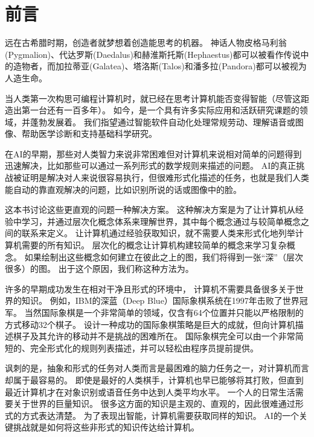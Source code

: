 \chapter{前言}
\label{chap:introduction}
远在古希腊时期，创造者就梦想着创造能思考的机器。
神话人物皮格马利翁(Pygmalion)、代达罗斯(Daedalus)和赫淮斯托斯(Hephaestus)都可以被看作传说中的造物者，而加拉蒂亚(Galatea)、塔洛斯(Talos)和潘多拉(Pandora)都可以被视为人造生命\citep{ovid2004metamorphoses,sparkes1996red,1997works}。

当人类第一次构思可编程计算机时，就已经在思考计算机能否变得智能（尽管这距造出第一台还有一百多年）\citep{Lovelace1842}。
如今，是一个具有许多实际应用和活跃研究课题的领域，并蓬勃发展着。
我们指望通过智能软件自动化处理常规劳动、理解语音或图像、帮助医学诊断和支持基础科学研究。

在\gls{AI}的早期，那些对人类智力来说非常困难但对计算机来说相对简单的问题得到迅速解决，比如那些可以通过一系列形式的数学规则来描述的问题。
\gls{AI}的真正挑战被证明是解决对人来说很容易执行，但很难形式化描述的任务，也就是我们人类能自动的靠直观解决的问题，比如识别所说的话或图像中的脸。

这本书讨论这些更直观的问题一种解决方案。
这种解决方案是为了让计算机从经验中学习，并通过层次化概念体系来理解世界，其中每个概念通过与较简单概念之间的联系来定义。
让计算机通过经验获取知识，就不需要人类来形式化地列举计算机需要的所有知识。
层次化的概念让计算机构建较简单的概念来学习复杂概念。
如果绘制出这些概念如何建立在彼此之上的图，我们将得到一张``深''（层次很多）的图。
出于这个原因，我们称这种方法为。


许多的早期成功发生在相对干净且形式的环境中， 计算机不需要具备很多关于世界的知识。
例如，IBM的深蓝（Deep Blue）国际象棋系统在1997年击败了世界冠军\citep{Hsu2002}。
当然国际象棋是一个非常简单的领域，仅含有64个位置并只能以严格限制的方式移动32个棋子。
设计一种成功的国际象棋策略是巨大的成就，但向计算机描述棋子及其允许的移动并不是挑战的困难所在。
国际象棋完全可以由一个非常简短的、完全形式化的规则列表描述，并可以轻松由程序员提前提供。

讽刺的是，抽象和形式的任务对人类而言是最困难的脑力任务之一，对计算机而言却属于最容易的。
即使是最好的人类棋手，计算机也早已能够将其打败，但直到最近计算机才在对象识别或语音任务中达到人类平均水平。
一个人的日常生活需要关于世界的巨量知识。
很多这方面的知识是主观的、直观的，因此很难通过形式的方式表达清楚。
为了表现出智能，计算机需要获取同样的知识。
\gls{AI}的一个关键挑战就是如何将这些非形式的知识传达给计算机。

